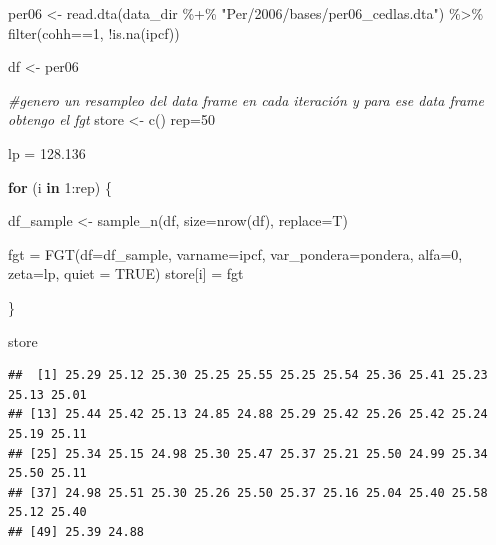 \documentclass[
]{book}
\newenvironment{Shaded}{\begin{snugshade}}{\end{snugshade}}
\newcommand{\AttributeTok}[1]{\textcolor[rgb]{0.77,0.63,0.00}{#1}}
\newcommand{\CommentTok}[1]{\textcolor[rgb]{0.56,0.35,0.01}{\textit{#1}}}
\newcommand{\ConstantTok}[1]{\textcolor[rgb]{0.00,0.00,0.00}{#1}}
\newcommand{\ControlFlowTok}[1]{\textcolor[rgb]{0.13,0.29,0.53}{\textbf{#1}}}
\newcommand{\DecValTok}[1]{\textcolor[rgb]{0.00,0.00,0.81}{#1}}
\newcommand{\FloatTok}[1]{\textcolor[rgb]{0.00,0.00,0.81}{#1}}
\newcommand{\FunctionTok}[1]{\textcolor[rgb]{0.00,0.00,0.00}{#1}}
\newcommand{\NormalTok}[1]{#1}
\newcommand{\OtherTok}[1]{\textcolor[rgb]{0.56,0.35,0.01}{#1}}
\newcommand{\SpecialCharTok}[1]{\textcolor[rgb]{0.00,0.00,0.00}{#1}}
\newcommand{\StringTok}[1]{\textcolor[rgb]{0.31,0.60,0.02}{#1}}
\begin{document}
\begin{Shaded}
\begin{Highlighting}[]
\NormalTok{per06 }\OtherTok{\textless{}{-}} \FunctionTok{read.dta}\NormalTok{(data\_dir }\SpecialCharTok{\%+\%} \StringTok{"Per/2006/bases/per06\_cedlas.dta"}\NormalTok{) }\SpecialCharTok{\%\textgreater{}\%} 
        \FunctionTok{filter}\NormalTok{(cohh}\SpecialCharTok{==}\DecValTok{1}\NormalTok{, }\SpecialCharTok{!}\FunctionTok{is.na}\NormalTok{(ipcf))}

\NormalTok{df }\OtherTok{\textless{}{-}}\NormalTok{ per06}

\CommentTok{\#genero un resampleo del data frame en cada iteración y para ese data frame obtengo el fgt}
\NormalTok{store }\OtherTok{\textless{}{-}} \FunctionTok{c}\NormalTok{()}
\NormalTok{rep}\OtherTok{=}\DecValTok{50}

\NormalTok{lp }\OtherTok{=} \FloatTok{128.136}

\ControlFlowTok{for}\NormalTok{ (i }\ControlFlowTok{in} \DecValTok{1}\SpecialCharTok{:}\NormalTok{rep) \{}
  
\NormalTok{   df\_sample }\OtherTok{\textless{}{-}} \FunctionTok{sample\_n}\NormalTok{(df, }\AttributeTok{size=}\FunctionTok{nrow}\NormalTok{(df), }\AttributeTok{replace=}\NormalTok{T)}
   
\NormalTok{   fgt }\OtherTok{=} \FunctionTok{FGT}\NormalTok{(}\AttributeTok{df=}\NormalTok{df\_sample, }\AttributeTok{varname=}\NormalTok{ipcf, }\AttributeTok{var\_pondera=}\NormalTok{pondera, }\AttributeTok{alfa=}\DecValTok{0}\NormalTok{, }\AttributeTok{zeta=}\NormalTok{lp, }\AttributeTok{quiet =} \ConstantTok{TRUE}\NormalTok{)}
\NormalTok{   store[i] }\OtherTok{=}\NormalTok{ fgt}
   
\NormalTok{\}}
\end{Highlighting}
\end{Shaded}

\begin{Shaded}
\begin{Highlighting}[]
\NormalTok{store}
\end{Highlighting}
\end{Shaded}

\begin{verbatim}
##  [1] 25.29 25.12 25.30 25.25 25.55 25.25 25.54 25.36 25.41 25.23 25.13 25.01
## [13] 25.44 25.42 25.13 24.85 24.88 25.29 25.42 25.26 25.42 25.24 25.19 25.11
## [25] 25.34 25.15 24.98 25.30 25.47 25.37 25.21 25.50 24.99 25.34 25.50 25.11
## [37] 24.98 25.51 25.30 25.26 25.50 25.37 25.16 25.04 25.40 25.58 25.12 25.40
## [49] 25.39 24.88
\end{verbatim}
\end{document}

